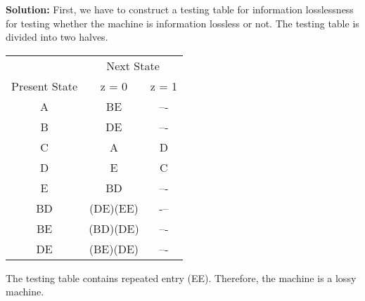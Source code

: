 \documentclass[a4,9pt]{beamer}
\begin{document}
\begin{frame}
\large{\textbf{Solution:}} First, we have to construct a testing table for information losslessness for testing whether the machine is information lossless or not. The testing table is divided into two halves.

\pause
\begin{center}
  \begin{tabular}{ccc}
\hline

\hline

\hline

\hline
 & \multicolumn{2}{c}{Next State}\\
 \cline{2-3}
Present State & z = 0 & z = 1\\
\hline
 A   &  BE  &   –- \\
 B   &  DE  &   –- \\
 C   &  A   &   D  \\
 D   &  E   &   C  \\
 E   &  BD  &   –- \\
\hline
 BD  &  (DE)(EE)  &   -–    \\
 BE  &  (BD)(DE)  &   –-    \\
 DE  &  (BE)(DE)  &   –-    \\
\hline

\hline

\hline

\hline

  \end{tabular}
\end{center}
\pause
The testing table contains repeated entry (EE). Therefore, the machine is a lossy machine.
\end{frame}
\end{document}
